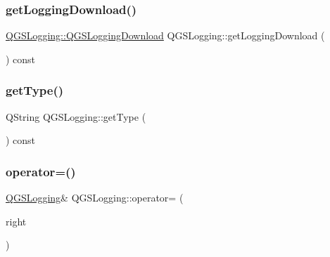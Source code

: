 \subsubsection{\texorpdfstring{get\+Logging\+Download()}{getLoggingDownload()}}
{\footnotesize\ttfamily \mbox{\hyperlink{class_q_g_s_logging_1_1_q_g_s_logging_download}{Q\+G\+S\+Logging\+::\+Q\+G\+S\+Logging\+Download}} Q\+G\+S\+Logging\+::get\+Logging\+Download (\begin{DoxyParamCaption}{ }\end{DoxyParamCaption}) const}

\mbox{\label{class_q_g_s_logging_ac5b7e93789940e5e4d6b3b641019bb4e}} 
\subsubsection{\texorpdfstring{get\+Type()}{getType()}}
{\footnotesize\ttfamily Q\+String Q\+G\+S\+Logging\+::get\+Type (\begin{DoxyParamCaption}{ }\end{DoxyParamCaption}) const}

\mbox{\label{class_q_g_s_logging_ac71452a5db13cc0218c6c1bf49250d64}} 
\subsubsection{\texorpdfstring{operator=()}{operator=()}\hspace{0.1cm}{\footnotesize\ttfamily [1/2]}}
{\footnotesize\ttfamily \mbox{\hyperlink{class_q_g_s_logging}{Q\+G\+S\+Logging}}\& Q\+G\+S\+Logging\+::operator= (\begin{DoxyParamCaption}\item[{const \mbox{\hyperlink{class_q_g_s_logging}{Q\+G\+S\+Logging}} \&}]{right }\end{DoxyParamCaption})\hspace{0.3cm}{\ttfamily [default]}}

\mbox{\label{class_q_g_s_logging_a572d40bc91794be005fc7e2378a72f06}} 
